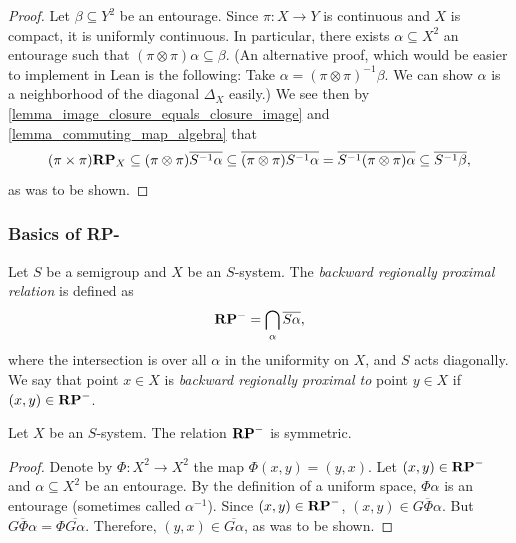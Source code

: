 \begin{proof}
\leanok{}
    Let $\beta \subseteq Y^2$ be an entourage.  Since $\pi: X \to Y$ is continuous and $X$ is compact, it is uniformly continuous.  In particular, there exists $\alpha \subseteq X^2$ an entourage such that $(\pi \otimes \pi) \alpha \subseteq \beta$. (An alternative proof, which would be easier to implement in Lean is the following: Take $\alpha = (\pi \otimes \pi)^{-1} \beta$. We can show $\alpha$ is a neighborhood of the diagonal $\Delta_X$ easily.) We see then by \cref{lemma_image_closure_equals_closure_image} and \cref{lemma_commuting_map_algebra} that
    \[
        (\pi \times \pi) \mathbf{RP}_X \subseteq (\pi \otimes \pi) \overline{S^{-1} \alpha} \subseteq \overline{(\pi \otimes \pi) S^{-1} \alpha} = \overline{S^{-1}(\pi \otimes \pi) \alpha} \subseteq \overline{S^{-1} \beta},\]
    as was to be shown.
\end{proof}


\subsubsection{Basics of RP-}


\begin{definition}
\label{def_rp_relation}
    Let $S$ be a semigroup and $X$ be an $S$-system.  The \emph{backward regionally proximal relation} is defined as
    \[\mathbf{RP}^- = \bigcap_{\alpha} \overline{S \alpha},\]
    where the intersection is over all $\alpha$ in the uniformity on $X$, and $S$ acts diagonally.  We say that point $x \in X$ is \emph{backward regionally proximal to} point $y \in X$ if $(x,y) \in \mathbf{RP}^-$.
\end{definition}

\begin{lemma}
    \label{lemma_rp_basics_symmetric}
    \leanok{}
    Let $X$ be an $S$-system.  The relation $\mathbf{RP}^-$ is symmetric.
\end{lemma}

\begin{proof}
\leanok{}
    Denote by $\Phi: X^2 \to X^2$ the map $\Phi(x,y) = (y,x)$. Let $(x,y) \in \mathbf{RP}^-$ and $\alpha \subseteq X^2$ be an entourage. By the definition of a uniform space, $\Phi \alpha$ is an entourage (sometimes called $\alpha^{-1}$). Since $(x,y) \in \mathbf{RP}^-$, $(x,y) \in \overline{G \Phi \alpha}$. But $\overline{G \Phi \alpha} = \Phi \overline{G \alpha}$. Therefore, $(y,x) \in \overline{G \alpha}$, as was to be shown.
\end{proof}

